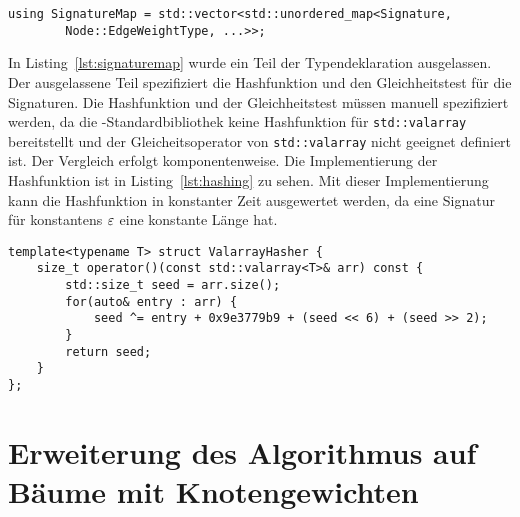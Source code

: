 \begin{lstlisting}[caption={Definition von \texttt{SignatureMap}}, label={lst:signaturemap}]
    using SignatureMap = std::vector<std::unordered_map<Signature, 
        Node::EdgeWeightType, ...>>;
\end{lstlisting}

In Listing~\ref{lst:signaturemap} wurde ein Teil der Typendeklaration ausgelassen.
Der ausgelassene Teil spezifiziert die Hashfunktion und den Gleichheitstest für die Signaturen.
Die Hashfunktion und der Gleichheitstest müssen manuell spezifiziert werden, da die \Cpp{}\hyp Standardbibliothek keine Hashfunktion für \texttt{std::valarray} bereitstellt und der Gleicheitsoperator von \texttt{std::valarray} nicht geeignet definiert ist.
Der Vergleich erfolgt komponentenweise.
Die Implementierung der Hashfunktion ist in Listing~\ref{lst:hashing} zu sehen.
Mit dieser Implementierung kann die Hashfunktion in konstanter Zeit ausgewertet werden, da eine Signatur für konstantens $\varepsilon$ eine konstante Länge hat.

\begin{lstlisting}[float, floatplacement=h, caption={Hashing mit \texttt{ValarrayHasher}}, label={lst:hashing}]
template<typename T> struct ValarrayHasher {
    size_t operator()(const std::valarray<T>& arr) const {
		std::size_t seed = arr.size();
		for(auto& entry : arr) {
			seed ^= entry + 0x9e3779b9 + (seed << 6) + (seed >> 2);
		}
		return seed;
	}
};
\end{lstlisting}

\section{Erweiterung des Algorithmus auf Bäume mit Knotengewichten}
